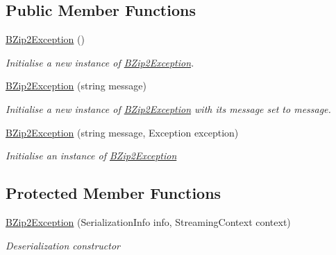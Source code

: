 \subsection*{Public Member Functions}
\begin{DoxyCompactItemize}
\item 
\hyperlink{class_i_c_sharp_code_1_1_sharp_zip_lib_1_1_b_zip2_1_1_b_zip2_exception_a237f46dae8032fc804a9c99cc332b4da}{B\+Zip2\+Exception} ()
\begin{DoxyCompactList}\small\item\em Initialise a new instance of \hyperlink{class_i_c_sharp_code_1_1_sharp_zip_lib_1_1_b_zip2_1_1_b_zip2_exception}{B\+Zip2\+Exception}. \end{DoxyCompactList}\item 
\hyperlink{class_i_c_sharp_code_1_1_sharp_zip_lib_1_1_b_zip2_1_1_b_zip2_exception_a3b8c2658c07e0215e36edbe126907eea}{B\+Zip2\+Exception} (string message)
\begin{DoxyCompactList}\small\item\em Initialise a new instance of \hyperlink{class_i_c_sharp_code_1_1_sharp_zip_lib_1_1_b_zip2_1_1_b_zip2_exception}{B\+Zip2\+Exception} with its message set to message. \end{DoxyCompactList}\item 
\hyperlink{class_i_c_sharp_code_1_1_sharp_zip_lib_1_1_b_zip2_1_1_b_zip2_exception_a4ef1ec1298859b382407bf2adf887dc2}{B\+Zip2\+Exception} (string message, Exception exception)
\begin{DoxyCompactList}\small\item\em Initialise an instance of \hyperlink{class_i_c_sharp_code_1_1_sharp_zip_lib_1_1_b_zip2_1_1_b_zip2_exception}{B\+Zip2\+Exception} \end{DoxyCompactList}\end{DoxyCompactItemize}
\subsection*{Protected Member Functions}
\begin{DoxyCompactItemize}
\item 
\hyperlink{class_i_c_sharp_code_1_1_sharp_zip_lib_1_1_b_zip2_1_1_b_zip2_exception_a0cf7caec7805a368c9d96d898e19c706}{B\+Zip2\+Exception} (Serialization\+Info info, Streaming\+Context context)
\begin{DoxyCompactList}\small\item\em Deserialization constructor \end{DoxyCompactList}\end{DoxyCompactItemize}


